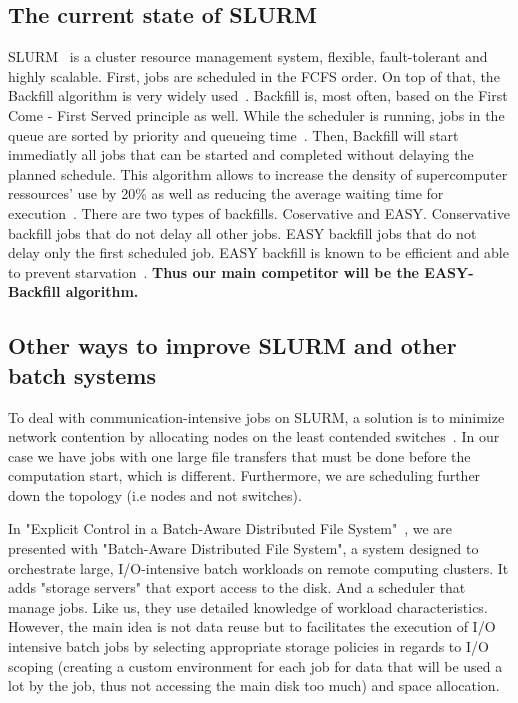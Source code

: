 \documentclass[a4paper]{article}
\begin{document}
\subsection{The current state of SLURM}
SLURM~\cite{SLURM} is a cluster resource management system, flexible, fault-tolerant and highly scalable.
First, jobs are scheduled in the FCFS order. 
On top of that, the Backfill algorithm is very widely used~\cite{New_Backfill}.
Backfill is, most often, based on the First Come - First Served principle as well. While the scheduler is running, jobs in the queue are sorted by priority and queueing time~\cite{New_Backfill}.
Then, Backfill will start immediatly all jobs that can be started and completed without delaying the planned schedule.
This algorithm allows to increase the density of supercomputer ressources' use by 20\% as well as reducing the average waiting time
for execution~\cite{Maui_Scheduler}.
There are two types of backfills. Coservative and EASY. Conservative backfill jobs that do not delay all other jobs. EASY backfill jobs that do not delay only the first scheduled job.
EASY backfill is known to be efficient and able to prevent starvation~\cite{easybf}.
\textbf{Thus our main competitor will be the EASY-Backfill algorithm.}

\subsection{Other ways to improve SLURM and other batch systems}
To deal with communication-intensive jobs on SLURM, a solution is to minimize network contention by allocating nodes on the least
contended switches~\cite{minimize_network_contention}. In our case we have
jobs with one large file transfers that must be done before the computation start, which is different.
Furthermore, we are scheduling further down the topology (i.e nodes and not switches).

In "Explicit Control in a Batch-Aware Distributed File System"~\cite{Explicit_Control_in_a_Batch-Aware_Distributed_File_System},
we are presented with "Batch-Aware Distributed File System", a system designed to orchestrate large, 
I/O-intensive batch workloads on remote computing clusters.
It adds "storage servers" that export access to the disk. And a scheduler that
manage jobs. 
Like us, they use detailed knowledge of workload characteristics.
However, the main idea is not data reuse but to
facilitates the execution of I/O intensive batch
jobs by selecting appropriate storage policies
in regards to I/O scoping (creating a custom environment for each job
for data that will be used a lot by the job, thus not accessing the main disk too
much) and space allocation.
\end{document}
